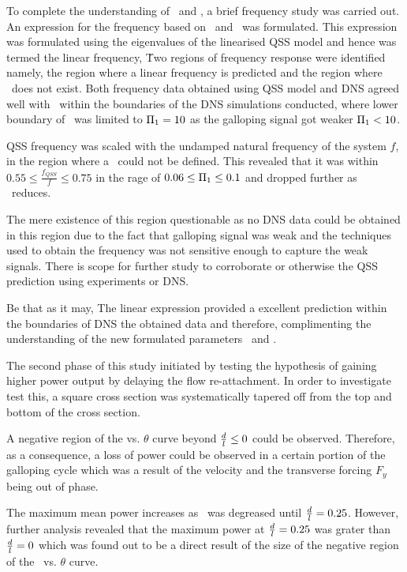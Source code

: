 To complete the understanding of \massstiff\ and \massdamp, a brief frequency study was carried out. An expression for the frequency based on \massstiff\ and \massdamp\ was formulated. This expression was formulated using the eigenvalues of the linearised QSS model and hence was termed the linear frequency,  \freqlin\. Two regions of frequency response were identified namely, the region where a linear frequency is predicted and the region where \freqlin\ does not exist. Both frequency data obtained using QSS model and DNS agreed well with \freqlin\ within the boundaries of the DNS simulations conducted, where lower boundary of \massstiff\ was limited to $\Pi_1=10$ as the galloping signal got weaker $\Pi_1<10$. 

QSS frequency was scaled with the undamped natural frequency of the system $f$, in the region where a \freqlin\ could not be defined. This revealed that it was within $0.55\leq\frac{f_{QSS}}{f}\leq0.75$ in the rage of $0.06\leq\Pi_1\leq0.1$ and dropped further as \massstiff\ reduces.  

The mere existence of this region questionable as no DNS data could be obtained in this region due to the fact that galloping signal was weak and the techniques used to obtain the  frequency was not sensitive enough to capture the weak signals. There is scope for further study to corroborate or otherwise the QSS prediction using experiments or DNS. 

Be that as it may, The linear expression provided a excellent prediction within the boundaries of DNS the obtained data and therefore, complimenting the understanding of the new formulated parameters \massstiff\ and \massdamp. 


The second phase of this study initiated by testing the hypothesis of gaining higher power output by delaying the flow re-attachment. In order to investigate test this, a square cross section was systematically tapered off from the top and bottom of the cross section.

A negative region of the \cy vs. $\theta$ curve beyond $\frac{d}{l}\leq0$ could be observed. Therefore, as a consequence, a loss of power could be observed in a certain portion of the galloping cycle which was a result of the velocity and the transverse forcing $F_{y}$ being out of phase. 

The maximum mean power increases as \ratio\ was degreased until $\frac{d}{l}=0.25$. However, further analysis revealed that the maximum power at $\frac{d}{l}=0.25$ was grater than $\frac{d}{l}=0$ which was found out to be a direct result of the size of the negative region of the \cy\ vs. $\theta$ curve.

